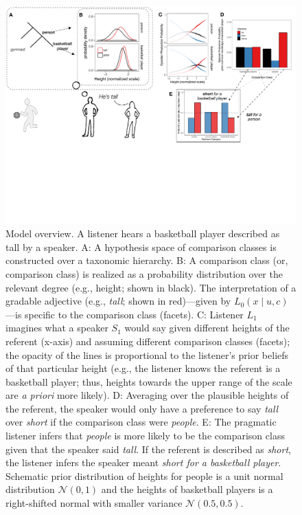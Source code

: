 \documentclass[doc, floatsintext]{apa6}
\begin{document}
\begin{figure}[!ht]
\centering
\includegraphics[width=\textwidth]{figs/model_cartoon.pdf}
\caption{\small \label{fig:modelCartoon}Model overview. A listener hears a basketball player described as tall by a speaker. A: A hypothesis space of comparison classes is constructed over a taxonomic hierarchy. B: A comparison class (or, comparison class) is realized as a probability distribution over the relevant degree (e.g., height; shown in black). The interpretation of a gradable adjective (e.g., \emph{tall}; shown in red)---given by $L_{0}(x \mid u, c)$---is specific to the comparison class (facets). C: Listener $L_1$ imagines what a speaker $S_1$ would say given different heights of the referent (x-axis) and assuming different comparison classes (facets); the opacity of the lines is proportional to the listener's prior beliefs of that particular height (e.g., the listener knows the referent is a basketball player; thus, heights towards the upper range of the scale are \emph{a priori} more likely). D: Averaging over the plausible heights of the referent, the speaker would only have a preference to say \emph{tall} over \emph{short} if the comparison class were \emph{people}. E: The pragmatic listener infers that \emph{people} is more likely to be the comparison class given that the speaker said \emph{tall}. If the referent is described as \emph{short}, the listener infers the speaker meant \emph{short for a basketball player}. Schematic prior distribution of heights for people is a unit normal distribution $\mathcal{N}(0, 1)$ and the heights of basketball players is a right-shifted normal with smaller variance $\mathcal{N}(0.5, 0.5)$.
}
\end{figure}
\end{document}
